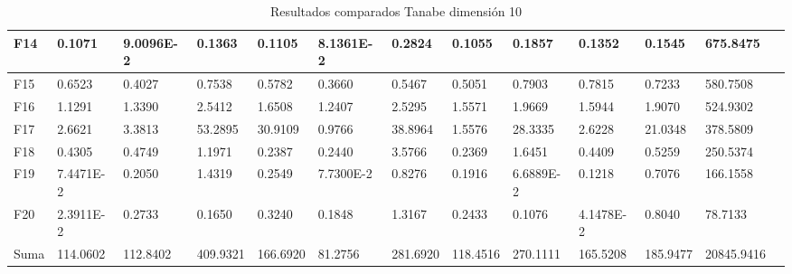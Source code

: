 \documentclass[12pt,a4paper]{article}
\begin{document}
\begin{table}[!h]
{\begin{tabular}{ | l | l | l | l | l | l | l | l | l | l | l | l | l | }
				F14 & 0.1071 & 9.0096E-2 & 0.1363 & 0.1105 & 8.1361E-2 & 0.2824 & 0.1055 & 0.1857 & 0.1352 & 0.1545 & 675.8475 \\ \hline
				F15 & 0.6523 & 0.4027 & 0.7538 & 0.5782 & 0.3660 & 0.5467 & 0.5051 & 0.7903 & 0.7815 & 0.7233 & 580.7508 \\ \hline
				F16 & 1.1291 & 1.3390 & 2.5412 & 1.6508 & 1.2407 & 2.5295 & 1.5571 & 1.9669 & 1.5944 & 1.9070 & 524.9302 \\ \hline
				F17 & 2.6621 & 3.3813 & 53.2895 & 30.9109 & 0.9766 & 38.8964 & 1.5576 & 28.3335 & 2.6228 & 21.0348 & 378.5809 \\ \hline
				F18 & 0.4305 & 0.4749 & 1.1971 & 0.2387 & 0.2440 & 3.5766 & 0.2369 & 1.6451 & 0.4409 & 0.5259 & 250.5374 \\ \hline
				F19 & 7.4471E-2 & 0.2050 & 1.4319 & 0.2549 & 7.7300E-2 & 0.8276 & 0.1916 & 6.6889E-2 & 0.1218 & 0.7076 & 166.1558 \\ \hline
				F20 & 2.3911E-2 & 0.2733 & 0.1650 & 0.3240 & 0.1848 & 1.3167 & 0.2433 & 0.1076 & 4.1478E-2 & 0.8040 & 78.7133 \\ \hline
				Suma & 114.0602 & 112.8402 & 409.9321 & 166.6920 & 81.2756 & 281.6920 & 118.4516 & 270.1111 & 165.5208 & 185.9477 & 20845.9416 \\ \hline
			\end{tabular}
		}
		\label{tablaTANABE-D10}
		\caption{Resultados comparados Tanabe dimensión 10}
	\end{table}
\end{document}
